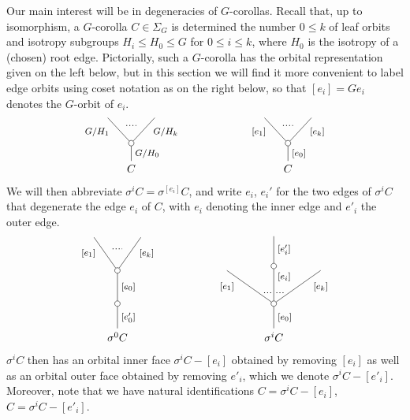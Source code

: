 \documentclass[a4paper,10pt
,draft
]{article}%
\renewcommand{\1}{\ensuremath{\mathbb{id}}}
\begin{document}
Our main interest will be in degeneracies of $G$-corollas. Recall that, up to isomorphism, 
a $G$-corolla $C \in \Sigma_G$ is determined the number $0 \leq k$ of leaf orbits
and isotropy subgroups
$H_i \leq H_0 \leq G$ for $0 \leq i \leq k$,
where $H_0$ is the isotropy of a (chosen) root edge.
Pictorially, such a $G$-corolla has the orbital representation given on the left below,
but in this section we will find it more convenient to label edge orbits using coset notation as on the right below,
so that $[e_i] = G e_i$ denotes the $G$-orbit of $e_i$.
\[
\begin{tikzpicture}
[grow=up,auto,level distance=2.3em,every node/.style = {font=\footnotesize},dummy/.style={circle,draw,inner sep=0pt,minimum size=1.75mm}]
	\node at (0,0) [font=\normalsize]{$C$}
		child{node [dummy] {}
			child{
			edge from parent node [swap,near end] {$G/H_k$} node [name=Kn] {}}
			child{
			edge from parent node [near end] {$G/H_1$}
node [name=Kone,swap] {}}
		edge from parent node [swap] {$G/H_0$}
		};
		\draw [dotted,thick] (Kone) -- (Kn) ;
	\node at (5,0) [font=\normalsize]{$C$}
		child{node [dummy] {}
			child{
			edge from parent node [swap,near end] {$[e_k]$} node [name=Kn] {}}
			child{
			edge from parent node [near end] {$[e_1]$}
node [name=Kone,swap] {}}
		edge from parent node [swap] {$[e_0]$}
		};
		\draw [dotted,thick] (Kone) -- (Kn) ;
\end{tikzpicture}
\]
We will then abbreviate $\sigma^i C = \sigma^{[e_i]} C$, and write $e_i$, $e_i'$ for the two edges of $\sigma^i C $ that degenerate the edge $e_i$ of $C$,
with $e_i$ denoting the inner edge and $e'_i$ the outer
edge.
\[
\begin{tikzpicture}
[grow=up,auto,level distance=3em,
every node/.style = {font=\footnotesize},
dummy/.style={circle,draw,inner sep=0pt,minimum size=1.75mm}]
	\node at (0,0) [font=\normalsize]{$\sigma^0 C$}
		child{node [dummy] {}
			child{node [dummy] {}
				child{
				edge from parent node [swap,near end] {$[e_k]$} node [name=Kn] {}}
				child{
				edge from parent node [near end] {$[e_1]$}
node [name=Kone,swap] {}}
			edge from parent node [swap] {$[e_0]$}}
		edge from parent node [swap] {$[e'_0]$}
		};
		\draw [dotted,thick] (Kone) -- (Kn) ;
	\node at (5,0) [font=\normalsize]{$\sigma^i C$}
		child{node [dummy] {}
			child{
			edge from parent node [swap,near end] {$[e_k]$} node [near start,inner sep=1pt,name=Kn] {}}
			child[level distance=3.4em]{node [dummy] {}
				child[level distance=2.7em]{
				edge from parent node [swap] {$[e'_i]$}
}
			edge from parent node [near end,swap] {$[e_i]$}
node [near start,inner sep=1pt,name=Kone,swap] {}
node [near start,inner sep=1pt,name=Kone1] {}}
			child{
			edge from parent node [near end] {$[e_1]$}
node [swap] {}
node [near start,inner sep=1pt,name=Kn1,swap]{}}
		edge from parent node [swap] {$[e_0]$}
		};
		\draw [dotted,thick] (Kone) -- (Kn) ;
		\draw [dotted,thick] (Kone1) -- (Kn1) ;
\end{tikzpicture}
\]
$\sigma^i C$ then has an orbital inner face
$\sigma^i C - [e_i]$ obtained by removing $[e_i]$
as well as an orbital outer face obtained by removing $e'_i$,
which we denote $\sigma^i C - [e'_i]$.
Moreover, note that we have natural identifications
$C = \sigma^i C - [e_i]$,
$C = \sigma^i C - [e'_i]$.
\end{document}

